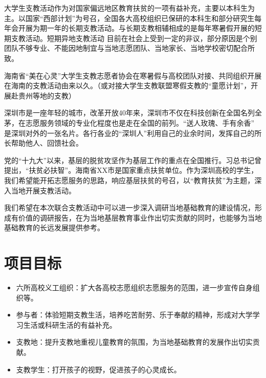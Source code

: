 \documentclass[12pt]{ctexart}
\begin{document}
大学生支教活动作为对国家偏远地区教育扶贫的一项有益补充，主要以本科生为主。以国家“西部计划”为号召，全国各大高校组织已保研的本科生和部分研究生每年会开展为期一年的长期支教活动。与长期支教相辅相成的是每年寒暑假开展的短期支教活动。短期异地支教活动
目前在社会上受到一定的非议，部分原因是个别团队不够专业、不能因地制宜与当地志愿团队、当地家长、当地学校密切配合所致。


海南省“美在心灵”大学生支教志愿者协会在寒暑假与高校团队对接、共同组织开展在海南的支教活动由来以久。（或对接大学生支教联盟寒假支教的“童愿计划”，开展赴贵州等地的支教）

深圳市是一座年轻的城市，改革开放40年来，深圳市不仅在科技创新在全国名列全茅，在志愿服务领域的专业化程度也是走在全国的前列。“送人玫瑰、手有余香” 是深圳对外的一张名片。各行各业的“深圳人”利用自己的业余时间，发挥自己的所长帮助他人、回馈社会。

党的“十九大”以来，基层的脱贫攻坚作为基层工作的重点在全国推行。习总书记曾提出，“扶贫必扶智”。海南省XX市是国家重点扶贫单位。作为深圳高校的学生，我们希望能开拓志愿服务的思路，响应基层扶贫的号召，以“教育扶贫”为主题，深入当地开展支教活动。

我们希望在本次联合支教活动中可以进一步深入调研当地基础教育的建设情况，形成有价值的调研报告，在为当地基层教育事业作出切实贡献的同时，也能够为当地基础教育的长远发展提供参考。

\section{项目目标}
\begin{itemize}
\item 六所高校义工组织：扩大各高校志愿组织志愿服务的范围，进一步宣传自身组织等。
\item 参与者：体验短期支教生活，培养吃苦耐劳、乐于奉献的精神，形成对大学学习生活或科研生活的有益补充。
\item 支教地：提升支教地重视儿童教育的氛围，为当地基础教育的发展作出切实贡献。
\item 支教学生：打开孩子的视野，促进孩子的心灵成长。
\end{itemize}
\end{document}
